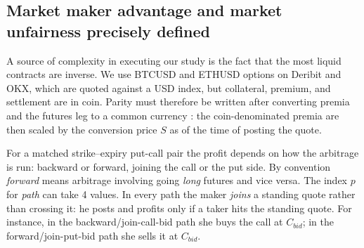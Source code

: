 \documentclass[12pt]{article}
\newcommand{\CostPerNotional}{0.003}%
\begin{document}

\subsection{Market maker advantage and market unfairness precisely defined}
\label{sec:def}

A source of complexity in executing our study is the fact that the most liquid contracts are inverse. We use  BTCUSD and ETHUSD options on Deribit and OKX, which are quoted against a USD index, but collateral, premium, and settlement are in coin. Parity must therefore be written after converting premia and the futures leg to a common currency \citep{alexander2023crypto, lucic2024valuation}: the coin-denominated premia are then scaled by the conversion price $S$ as of the time of posting the quote. 

For a matched strike--expiry put-call pair the profit depends on how the arbitrage is run: backward or forward, joining the call or the put side. By convention \emph{forward} means arbitrage involving going \emph{long} futures and vice versa. The index $p$ for \emph{path} can take 4 values. In every path the maker \emph{joins} a standing quote rather than crossing it: he posts and profits only if a taker hits the standing quote. For instance, in the backward/join-call-bid path she buys the call at $C_{bid}$; in the forward/join-put-bid path she sells it at $C_{bid}$. 
\end{document}
